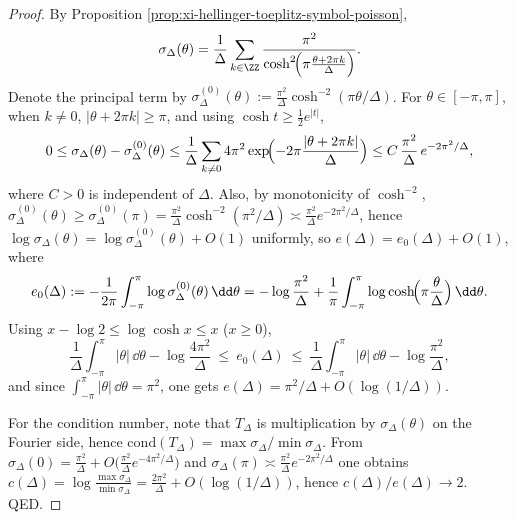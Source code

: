 \begin{proof}
By Proposition \ref{prop:xi-hellinger-toeplitz-symbol-poisson},
\[
\sigma_\Delta(\theta)=\frac{1}{\Delta}\sum_{k\in\ZZ}\frac{\pi^{2}}{\cosh^{2}\!\Bigl(\pi\frac{\theta+2\pi k}{\Delta}\Bigr)}.
\]
Denote the principal term by
\(
\sigma_\Delta^{(0)}(\theta):=\frac{\pi^{2}}{\Delta}\cosh^{-2}(\pi\theta/\Delta)
\).
For \(\theta\in[-\pi,\pi]\), when \(k\neq0\), \(|\theta+2\pi k|\ge\pi\), and using \(\cosh t\ge \tfrac12 e^{|t|}\),
\[
0\le \sigma_\Delta(\theta)-\sigma_\Delta^{(0)}(\theta)
\le \frac{1}{\Delta}\sum_{k\neq0}4\pi^{2}\exp\!\Bigl(-2\pi\frac{|\theta+2\pi k|}{\Delta}\Bigr)
\le C\,\frac{\pi^{2}}{\Delta}\,e^{-2\pi^{2}/\Delta},
\]
where \(C>0\) is independent of \(\Delta\).
Also, by monotonicity of \(\cosh^{-2}\),
\(
\sigma_\Delta^{(0)}(\theta)\ge \sigma_\Delta^{(0)}(\pi)=\frac{\pi^{2}}{\Delta}\cosh^{-2}(\pi^{2}/\Delta)
\asymp \frac{\pi^{2}}{\Delta}e^{-2\pi^{2}/\Delta}
\),
hence \(\log\sigma_\Delta(\theta)=\log\sigma_\Delta^{(0)}(\theta)+O(1)\) uniformly, so \(e(\Delta)=e_0(\Delta)+O(1)\), where
\[
e_0(\Delta):=-\frac{1}{2\pi}\int_{-\pi}^{\pi}\log\sigma_\Delta^{(0)}(\theta)\,\dd\theta
=-\log\frac{\pi^{2}}{\Delta}+\frac{1}{\pi}\int_{-\pi}^{\pi}\log\cosh\!\Bigl(\pi\frac{\theta}{\Delta}\Bigr)\,\dd\theta.
\]
Using \(x-\log2\le \log\cosh x\le x\) (\(x\ge0\)),
\[
\frac{1}{\Delta}\int_{-\pi}^{\pi}|\theta|\,\dd\theta-\log\frac{4\pi^{2}}{\Delta}
\ \le\ e_0(\Delta)\ \le\
\frac{1}{\Delta}\int_{-\pi}^{\pi}|\theta|\,\dd\theta-\log\frac{\pi^{2}}{\Delta},
\]
and since \(\int_{-\pi}^{\pi}|\theta|\,\dd\theta=\pi^{2}\), one gets \(e(\Delta)=\pi^{2}/\Delta+O(\log(1/\Delta))\).
\par
For the condition number, note that \(T_\Delta\) is multiplication by \(\sigma_\Delta(\theta)\) on the Fourier side, hence \(\mathrm{cond}(T_\Delta)=\max\sigma_\Delta/\min\sigma_\Delta\).
From \(\sigma_\Delta(0)=\frac{\pi^{2}}{\Delta}+O\!\bigl(\frac{\pi^{2}}{\Delta}e^{-4\pi^{2}/\Delta}\bigr)\) and
\(
\sigma_\Delta(\pi)\asymp \frac{\pi^{2}}{\Delta}e^{-2\pi^{2}/\Delta}
\)
one obtains
\(
c(\Delta)=\log\frac{\max\sigma_\Delta}{\min\sigma_\Delta}
=\frac{2\pi^{2}}{\Delta}+O(\log(1/\Delta))
\),
hence \(c(\Delta)/e(\Delta)\to2\). QED.
\end{proof}

